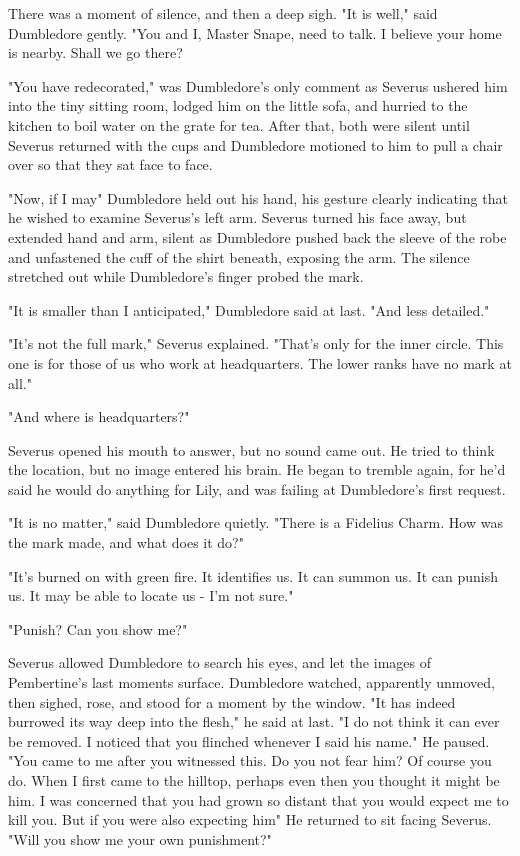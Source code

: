 There was a moment of silence, and then a deep sigh. "It is well," said Dumbledore gently. "You and I, Master Snape, need to talk. I believe your home is nearby. Shall we go there?

"You have redecorated," was Dumbledore's only comment as Severus ushered him into the tiny sitting room, lodged him on the little sofa, and hurried to the kitchen to boil water on the grate for tea. After that, both were silent until Severus returned with the cups and Dumbledore motioned to him to pull a chair over so that they sat face to face.

"Now, if I may{\el}" Dumbledore held out his hand, his gesture clearly indicating that he wished to examine Severus's left arm. Severus turned his face away, but extended hand and arm, silent as Dumbledore pushed back the sleeve of the robe and unfastened the cuff of the shirt beneath, exposing the arm. The silence stretched out while Dumbledore's finger probed the mark.

"It is smaller than I anticipated," Dumbledore said at last. "And less detailed."

"It's not the full mark," Severus explained. "That's only for the inner circle. This one is for those of us who work at headquarters. The lower ranks have no mark at all."

"And where is headquarters?"

Severus opened his mouth to answer, but no sound came out. He tried to think the location, but no image entered his brain. He began to tremble again, for he'd said he would do anything for Lily, and was failing at Dumbledore's first request.

"It is no matter," said Dumbledore quietly. "There is a Fidelius Charm. How was the mark made, and what does it do?"

"It's burned on with green fire. It identifies us. It can summon us. It can punish us. It may be able to locate us - I'm not sure."

"Punish? Can you show me?"

Severus allowed Dumbledore to search his eyes, and let the images of Pembertine's last moments surface. Dumbledore watched, apparently unmoved, then sighed, rose, and stood for a moment by the window. "It has indeed burrowed its way deep into the flesh," he said at last. "I do not think it can ever be removed. I noticed that you flinched whenever I said{\el} his name." He paused. "You came to me after you witnessed this. Do you not fear him? Of course you do. When I first came to the hilltop, perhaps even then you thought it might be him. I was concerned that you had grown so distant that you would expect me to kill you. But if you were also expecting him{\el}" He returned to sit facing Severus. "Will you show me your own punishment?"

